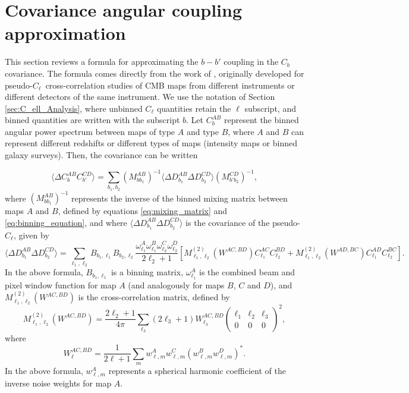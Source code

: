 \documentclass[fleqn,usenatbib]{mnras}
\newcommand{\pcl}{pseudo-$C_{\ell}$}
\begin{document}
\section{Covariance angular coupling approximation}
\label{sec:Appendix_coupling_approximation}
This section reviews a formula for approximating the $b-b'$ coupling in the $C_b$ covariance. The formula comes directly from the work of \cite{tristram2005xspect}, originally developed for \pcl\ cross-correlation studies of CMB maps from different instruments or different detectors of the same instrument. We use the notation of Section\,\ref{sec:C_ell_Analysis}, where unbinned $C_{\ell}$ quantities retain the $\ell$ subscript, and binned quantities are written with the subscript $b$. Let $C_b^{AB}$ represent the binned angular power spectrum between maps of type $A$ and type $B$, where $A$ and $B$ can represent different redshifts or different types of maps (intensity maps or binned galaxy surveys). Then, the covariance can be written

\begin{equation}\label{eq:Tristram_cl_cov}
\langle \Delta C_b^{AB} C_{b'}^{CD}\rangle    = \sum_{b_1, b_2} (M^{AB}_{b b_{1}})^{-1} \langle \Delta D_{b_1}^{AB} \Delta D_{b_2}^{CD}\rangle (M^{CD}_{b' b_{2}})^{-1},
\end{equation}
where $(M^{AB}_{b b_{1}})^{-1}$ represents the inverse of the binned mixing matrix between maps $A$ and $B$, defined by equations \ref{eq:mixing_matrix} and \ref{eq:binning_equation}, and where $\langle \Delta D_{b_1}^{AB} \Delta D_{b_2}^{CD}\rangle$ is the covariance of the \pcl, given by
\begin{equation}\label{eq:Tristram_pcl_cov}
\langle \Delta D_{b_1}^{AB} \Delta D_{b_2}^{CD}\rangle = \sum_{\ell_1, \ell_2} B_{b_1, \ell_1}B_{b_2, \ell_2}\frac{\omega^A_{\ell_1}\omega^B_{\ell_1}\omega^C_{\ell_2}\omega^D_{\ell_2}}{2\ell_2 + 1} [M^{(2)}_{\ell_1,\ell_2}(W^{AC,BD})C_{\ell_1}^{AC}C_{\ell_2}^{BD} + M^{(2)}_{\ell_1,\ell_2}(W^{AD,BC})C_{\ell_1}^{AD}C_{\ell_2}^{BC}].
\end{equation}
In the above formula, $B_{b_1, \ell_1}$ is a binning matrix, $\omega^A_{\ell_1}$ is the combined beam and pixel window function for map $A$ (and analogously for maps $B$, $C$ and $D$), and $M^{(2)}_{\ell_1,\ell_2}(W^{AC,BD})$ is the cross-correlation matrix, defined by 
\begin{equation}
M^{(2)}_{\ell_1,\ell_2}(W^{AC,BD}) = \frac{2\ell_2 + 1}{4 \pi} \sum_{\ell_3}(2\ell_3+1)W^{AC,BD}_{\ell_3}\begin{pmatrix} \ell_1&\ell_2&\ell_3 \\ 0&0&0\end{pmatrix}^2,
\end{equation}
where
\begin{equation}
W^{AC,BD}_{\ell} = \frac{1}{2\ell + 1} \sum_m w^A_{\ell,m}w^C_{\ell,m} (w^B_{\ell,m}w^D_{\ell,m})^*.
\end{equation}
In the above formula, $w^A_{\ell,m}$ represents a spherical harmonic coefficient of the inverse noise weights for map $A$. 
\end{document}

